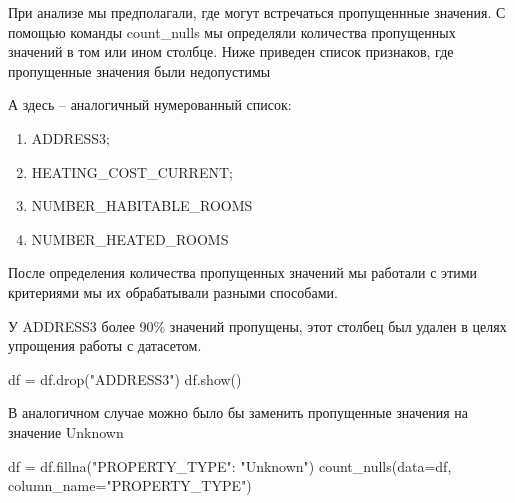 
При анализе мы предполагали, где  могут встречаться пропущеннные значения. С помощью команды count\_nulls мы определяли количества пропущенных значений в том или ином столбце. Ниже приведен список признаков, где пропущенные значения были недопустимы

А здесь -- аналогичный нумерованный список:

\begin{enumerate}
    \item ADDRESS3;
    \item HEATING\_COST\_CURRENT;
    \item NUMBER\_HABITABLE\_ROOMS
    \item NUMBER\_HEATED\_ROOMS
\end{enumerate}
\par После определения количества пропущенных значений мы работали с этими критериями мы их обрабатывали разными способами.
\par У ADDRESS3 более 90\% значений пропущены, этот столбец был удален в целях упрощения работы с датасетом.
\begin{code}
df = df.drop("ADDRESS3")
df.show()
\end{code}
В аналогичном случае можно было бы заменить пропущенные значения на значение Unknown
\begin{code}
df = df.fillna({"PROPERTY\_TYPE": "Unknown"})
count\_nulls(data=df, column\_name="PROPERTY\_TYPE")
\end{code}

